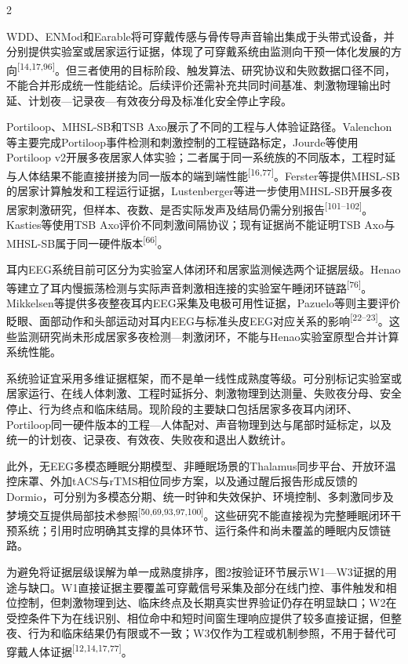 \documentclass[UTF8,zihao=5,fontset=none]{ctexart}
\newcommand{\refcite}[1]{\nolinebreak[4]\textsuperscript{[#1]}}
\begin{document}
\begin{multicols}{2}

WDD、ENMod和Earable将可穿戴传感与骨传导声音输出集成于头带式设备，并分别提供实验室或居家运行证据，体现了可穿戴系统由监测向干预一体化发展的方向\refcite{14,17,96}。但三者使用的目标阶段、触发算法、研究协议和失败数据口径不同，不能合并形成统一性能结论。后续评价还需补充共同时间基准、刺激物理输出时延、计划夜—记录夜—有效夜分母及标准化安全停止字段。\par

Portiloop、MHSL-SB和TSB Axo展示了不同的工程与人体验证路径。Valenchon等主要完成Portiloop事件检测和刺激控制的工程链路标定，Jourde等使用Portiloop v2开展多夜居家人体实验；二者属于同一系统族的不同版本，工程时延与人体结果不能直接拼接为同一版本的端到端性能\refcite{16,77}。Ferster等提供MHSL-SB的居家计算触发和工程运行证据，Lustenberger等进一步使用MHSL-SB开展多夜居家刺激研究，但样本、夜数、是否实际发声及结局仍需分别报告\refcite{101--102}。Kasties等使用TSB Axo评价不同刺激间隔协议；现有证据尚不能证明TSB Axo与MHSL-SB属于同一硬件版本\refcite{66}。\par

耳内EEG系统目前可区分为实验室人体闭环和居家监测候选两个证据层级。Henao等建立了耳内慢振荡检测与实际声音刺激相连接的实验室午睡闭环链路\refcite{76}。Mikkelsen等提供多夜整夜耳内EEG采集及电极可用性证据，Pazuelo等则主要评价眨眼、面部动作和头部运动对耳内EEG与标准头皮EEG对应关系的影响\refcite{22--23}。这些监测研究尚未形成居家多夜检测—刺激闭环，不能与Henao实验室原型合并计算系统性能。\par

系统验证宜采用多维证据框架，而不是单一线性成熟度等级。可分别标记实验室或居家运行、在线人体刺激、工程时延拆分、刺激物理到达测量、失败夜分母、安全停止、行为终点和临床结局。现阶段的主要缺口包括居家多夜耳内闭环、Portiloop同一硬件版本的工程—人体配对、声音物理到达与尾部时延标定，以及统一的计划夜、记录夜、有效夜、失败夜和退出人数统计。\par

此外，无EEG多模态睡眠分期模型、非睡眠场景的Thalamus同步平台、开放环温控床罩、外加tACS与rTMS相位同步方案，以及通过醒后报告形成反馈的Dormio，可分别为多模态分期、统一时钟和失效保护、环境控制、多刺激同步及梦境交互提供局部技术参照\refcite{50,69,93,97,100}。这些研究不能直接视为完整睡眠闭环干预系统；引用时应明确其支撑的具体环节、运行条件和尚未覆盖的睡眠内反馈链路。\par

为避免将证据层级误解为单一成熟度排序，图2按验证环节展示W1—W3证据的用途与缺口。W1直接证据主要覆盖可穿戴信号采集及部分在线门控、事件触发和相位控制，但刺激物理到达、临床终点及长期真实世界验证仍存在明显缺口；W2在受控条件下为在线识别、相位命中和短时间窗生理响应提供了较多直接证据，但整夜、行为和临床结果仍有限或不一致；W3仅作为工程或机制参照，不用于替代可穿戴人体证据\refcite{12,14,17,77}。\par

\end{multicols}
\end{document}
